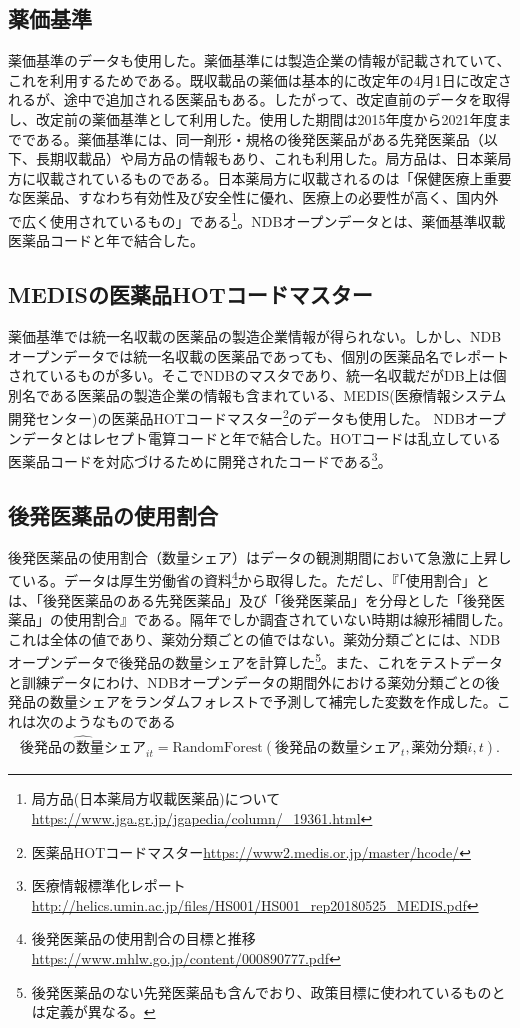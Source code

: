 \documentclass[a4paper,11pt,uplatex]{jsarticle}
\theoremstyle{definition}
\begin{document}
\subsection{薬価基準}
薬価基準のデータも使用した。薬価基準には製造企業の情報が記載されていて、これを利用するためである。既収載品の薬価は基本的に改定年の4月1日に改定されるが、途中で追加される医薬品もある。したがって、改定直前のデータを取得し、改定前の薬価基準として利用した。使用した期間は2015年度から2021年度までである。薬価基準には、同一剤形・規格の後発医薬品がある先発医薬品（以下、長期収載品）や局方品の情報もあり、これも利用した。局方品は、日本薬局方に収載されているものである。日本薬局方に収載されるのは「保健医療上重要な医薬品、すなわち有効性及び安全性に優れ、医療上の必要性が高く、国内外で広く使用されているもの」である\footnote{局方品(日本薬局方収載医薬品)について\url{https://www.jga.gr.jp/jgapedia/column/_19361.html}}。NDBオープンデータとは、薬価基準収載医薬品コードと年で結合した。 
\subsection{MEDISの医薬品HOTコードマスター}
薬価基準では統一名収載の医薬品の製造企業情報が得られない。しかし、NDBオープンデータでは統一名収載の医薬品であっても、個別の医薬品名でレポートされているものが多い。そこでNDBのマスタであり、統一名収載だがDB上は個別名である医薬品の製造企業の情報も含まれている、MEDIS(医療情報システム開発センター)の医薬品HOTコードマスター\footnote{医薬品HOTコードマスター\url{https://www2.medis.or.jp/master/hcode/}}のデータも使用した。
NDBオープンデータとはレセプト電算コードと年で結合した。HOTコードは乱立している医薬品コードを対応づけるために開発されたコードである\footnote{医療情報標準化レポート\url{http://helics.umin.ac.jp/files/HS001/HS001_rep20180525_MEDIS.pdf}}。
\subsection{後発医薬品の使用割合}
後発医薬品の使用割合（数量シェア）はデータの観測期間において急激に上昇している。データは厚生労働省の資料\footnote{後発医薬品の使用割合の目標と推移\url{https://www.mhlw.go.jp/content/000890777.pdf}}から取得した。ただし、『「使用割合」とは、「後発医薬品のある先発医薬品」及び「後発医薬品」を分母とした「後発医薬品」の使用割合』である。隔年でしか調査されていない時期は線形補間した。これは全体の値であり、薬効分類ごとの値ではない。薬効分類ごとには、NDBオープンデータで後発品の数量シェアを計算した\footnote{後発医薬品のない先発医薬品も含んでおり、政策目標に使われているものとは定義が異なる。}。また、これをテストデータと訓練データにわけ、NDBオープンデータの期間外における薬効分類ごとの後発品の数量シェアをランダムフォレストで予測して補完した変数を作成した。これは次のようなものである
\begin{align*}
\widehat {後発品の数量シェア}_{it}= \textrm{RandomForest}(後発品の数量シェア_t,薬効分類i,t).
\end{align*}
\end{document}
